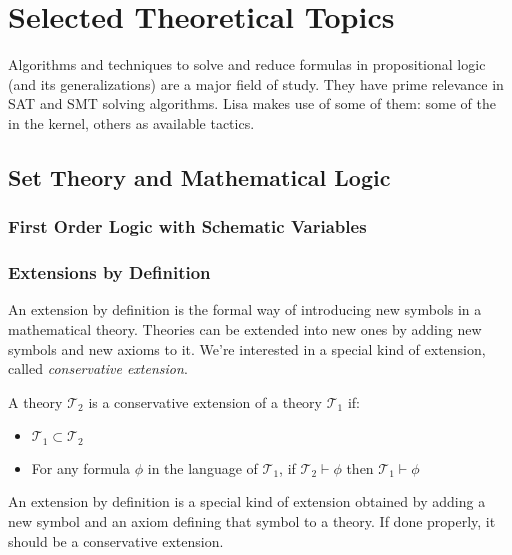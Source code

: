 \chapter{Selected Theoretical Topics}
\label{part:theory}

Algorithms and techniques to solve and reduce formulas in propositional logic (and its generalizations) are a major field of study. They have prime relevance in SAT and SMT solving algorithms. Lisa makes use of some of them: some of the in the kernel, others as available tactics. 

\section{Set Theory and Mathematical Logic}
\subsection{First Order Logic with Schematic Variables}
\label{sec:theoryfol}
\subsection{Extensions by Definition}
\label{sec:definitions}

An extension by definition is the formal way of introducing new symbols in a mathematical theory.
Theories can be extended into new ones by adding new symbols and new axioms to it. We're interested in a special kind of extension, called \textit{conservative extension}.
\begin{definition}

    A theory $\mathcal{T}_2$ is a conservative extension of a theory $\mathcal{T}_1$ if:
    \begin{itemize}
        \item $\mathcal{T}_1 \subset \mathcal{T}_2$
        \item For any formula $\phi$ in the language of $\mathcal{T}_1$, if $\mathcal{T}_2 \vdash 		\phi$ then $\mathcal{T}_1 \vdash \phi$
    \end{itemize}
\end{definition}

An extension by definition is a special kind of extension obtained by adding a new symbol and an axiom defining that symbol to a theory. If done properly, it should be a conservative extension.

